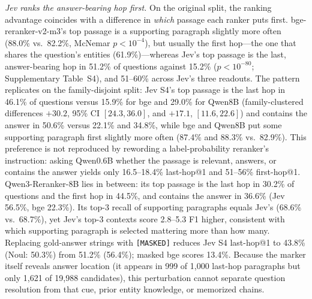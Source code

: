 \emph{Jev ranks the answer-bearing hop first.} On the original split, the ranking advantage coincides with a difference in \emph{which} passage each ranker puts first. bge-reranker-v2-m3's top passage is a supporting paragraph slightly more often (88.0\% vs.\ 82.2\%, McNemar $p<10^{-4}$), but usually the first hop---the one that shares the question's entities (61.9\%)---whereas Jev's top passage is the last, answer-bearing hop in 51.2\% of questions against 15.2\% ($p<10^{-80}$; Supplementary Table~S4), and 51--60\% across Jev's three readouts. The pattern replicates on the family-disjoint split: Jev S4's top passage is the last hop in 46.1\% of questions versus 15.9\% for bge and 29.0\% for Qwen8B (family-clustered differences $+30.2$, 95\% CI $[24.3,36.0]$, and $+17.1$, $[11.6,22.6]$) and contains the answer in 50.6\% versus 22.1\% and 34.8\%, while bge and Qwen8B put some supporting paragraph first slightly more often (87.4\% and 88.3\% vs.\ 82.9\%).
This preference is not reproduced by rewording a label-probability reranker's instruction: asking Qwen0.6B whether the passage is relevant, answers, or contains the answer yields only 16.5--18.4\% last-hop@1 and 51--56\% first-hop@1. Qwen3-Reranker-8B lies in between: its top passage is the last hop in 30.2\% of questions and the first hop in 44.5\%, and contains the answer in 36.6\% (Jev 56.5\%, bge 22.3\%). Its top-3 recall of supporting paragraphs equals Jev's (68.6\% vs.\ 68.7\%), yet Jev's top-3 contexts score 2.8--5.3 F1 higher, consistent with which supporting paragraph is selected mattering more than how many.
Replacing gold-answer strings with \texttt{[MASKED]} reduces Jev S4 last-hop@1 to 43.8\% (Noul: 50.3\%) from 51.2\% (56.4\%); masked bge scores 13.4\%. Because the marker itself reveals answer location (it appears in 999 of 1{,}000 last-hop paragraphs but only 1{,}621 of 19{,}988 candidates), this perturbation cannot separate question resolution from that cue, prior entity knowledge, or memorized chains.

